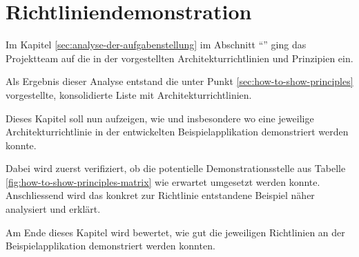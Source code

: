 \chapter{Richtliniendemonstration}

Im Kapitel \ref{sec:analyse-der-aufgabenstellung} im Abschnitt ``'' ging das Projektteam auf die in der  vorgestellten Architekturrichtlinien und Prinzipien ein.

Als Ergebnis dieser Analyse entstand die unter Punkt \ref{sec:how-to-show-principles} vorgestellte, konsolidierte Liste mit Architekturrichtlinien.

Dieses Kapitel soll nun aufzeigen, wie und insbesondere wo eine jeweilige Architekturrichtlinie in der entwickelten Beispielapplikation demonstriert werden konnte.

Dabei wird zuerst verifiziert, ob die potentielle Demonstrationsstelle aus Tabelle \ref{fig:how-to-show-principles-matrix} wie erwartet umgesetzt werden konnte.
Anschliessend wird das konkret zur Richtlinie entstandene Beispiel näher analysiert und erklärt.

Am Ende dieses Kapitel wird bewertet, wie gut die jeweiligen Richtlinien an der Beispielapplikation demonstriert werden konnten.

\newpage

%

%

%
%


%
%
%
%
%
%
%
%

%
%

%


%